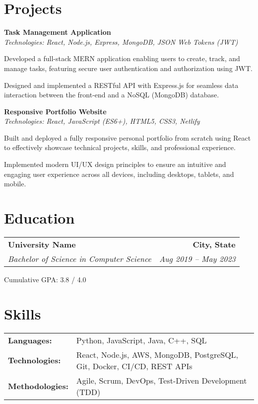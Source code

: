 \documentclass[10pt, letterpaper]{article}
\makeatletter
\newcommand{\resumeheading}[4]{
  \vspace{2pt}
  \item
    \begin{tabular*}{\textwidth}{l@{\extracolsep{\fill}}r}
      \textbf{#1} & \textbf{#2} \\
      \textit{\color{gray}#3} & \textit{\color{gray}#4} \\
    \end{tabular*}
  \vspace{-8pt} %
}
\newcommand{\projectheading}[2]{
  \vspace{2pt}
  \item
    \textbf{#1} \\
    \textit{\color{gray}#2}
  \vspace{-8pt}
}
\newcommand{\resumebullet}[1]{\item\small{#1}}
\makeatother
\begin{document}
\section{Projects}
\begin{resumelist}
    \projectheading
      {Task Management Application}
      {Technologies: React, Node.js, Express, MongoDB, JSON Web Tokens (JWT)}
    \begin{bulletlist}
        \resumebullet{Developed a full-stack MERN application enabling users to create, track, and manage tasks, featuring secure user authentication and authorization using JWT.}
        \resumebullet{Designed and implemented a RESTful API with Express.js for seamless data interaction between the front-end and a NoSQL (MongoDB) database.}
    \end{bulletlist}
    \vspace{6pt} %
    \projectheading
      {Responsive Portfolio Website}
      {Technologies: React, JavaScript (ES6+), HTML5, CSS3, Netlify}
    \begin{bulletlist}
        \resumebullet{Built and deployed a fully responsive personal portfolio from scratch using React to effectively showcase technical projects, skills, and professional experience.}
        \resumebullet{Implemented modern UI/UX design principles to ensure an intuitive and engaging user experience across all devices, including desktops, tablets, and mobile.}
    \end{bulletlist}
\end{resumelist}

\section{Education}
\begin{resumelist}
    \resumeheading
      {University Name}{City, State}
      {Bachelor of Science in Computer Science}{Aug 2019 -- May 2023}
    \begin{bulletlist}
        \resumebullet{Cumulative GPA: 3.8 / 4.0}
    \end{bulletlist}
\end{resumelist}

\section{Skills}
\vspace{4pt}
\begin{tabularx}{\textwidth}{@{} l X @{}}
    \textbf{Languages:} & Python, JavaScript, Java, C++, SQL \\
    \textbf{Technologies:} & React, Node.js, AWS, MongoDB, PostgreSQL, Git, Docker, CI/CD, REST APIs \\
    \textbf{Methodologies:} & Agile, Scrum, DevOps, Test-Driven Development (TDD) \\
\end{tabularx}
\end{document}
